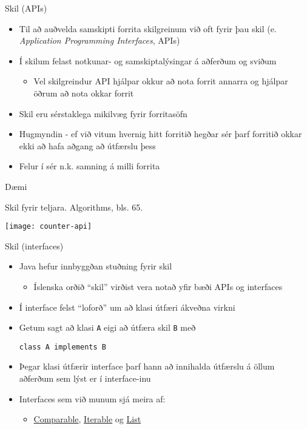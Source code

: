 \documentclass{beamer}
\begin{document}
\begin{frame}{Skil (APIs)}
	\begin{itemize}
		\item Til að auðvelda samskipti forrita skilgreinum við oft fyrir þau skil (e. \emph{Application Programming Interfaces}, APIs)
		\item Í skilum felast notkunar- og samskiptalýsingar á aðferðum og sviðum
		\begin{itemize}
			\item Vel skilgreindur API hjálpar okkur að nota forrit annarra og hjálpar öðrum að nota okkar forrit
		\end{itemize}
		\item Skil eru sérstaklega mikilvæg fyrir forritasöfn 
		\item Hugmyndin - ef við vitum hvernig hitt forritið hegðar sér þarf forritið okkar ekki að hafa aðgang að útfærslu þess
		\item Felur í sér n.k. samning á milli forrita
	\end{itemize}
\end{frame}

\begin{frame}{Dæmi}
	\begin{center}
		Skil fyrir teljara. Algorithms, bls. 65.

		\texttt{[image: counter-api]}
	\end{center}
\end{frame}

\begin{frame}[fragile]{Skil (interfaces)}
	\begin{itemize}
		\item Java hefur innbyggðan stuðning fyrir skil 
		      \begin{itemize}
			      \item Íslenska orðið ``skil'' virðist vera notað yfir bæði APIs og interfaces
		      \end{itemize}
		\item Í interface felst ``loforð'' um að klasi útfæri ákveðna virkni
		\item Getum sagt að klasi \texttt{A} eigi að útfæra skil \texttt{B} með
		      \begin{verbatim}
class A implements B
	\end{verbatim}
		\item Þegar klasi útfærir interface þarf hann að innihalda útfærslu á öllum aðferðum sem lýst er í interface-inu
		\item Interfaces sem við munum sjá meira af:
		      \begin{itemize}
			      \item \href{https://docs.oracle.com/javase/8/docs/api/java/lang/Comparable.html}{Comparable}, \href{https://docs.oracle.com/javase/8/docs/api/java/lang/Iterable.html}{Iterable} og \href{https://docs.oracle.com/javase/8/docs/api/java/util/List.html}{List}
		      \end{itemize}
	\end{itemize}
\end{frame}
\end{document}
